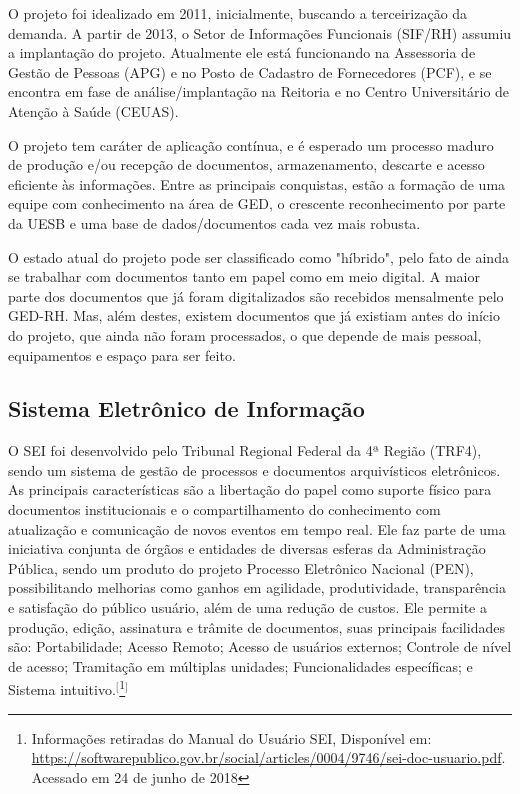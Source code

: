 O projeto foi idealizado em 2011, inicialmente, buscando a terceirização da demanda. A partir de 2013, o Setor de Informações Funcionais (SIF/RH) assumiu a implantação do projeto. Atualmente ele está funcionando na Assessoria de Gestão de Pessoas (APG) e no Posto de Cadastro de Fornecedores (PCF), e se encontra em fase de análise/implantação na Reitoria e no Centro Universitário de Atenção à Saúde (CEUAS). 

O projeto tem caráter de aplicação contínua, e é esperado um processo maduro de produção e/ou recepção de documentos, armazenamento, descarte e acesso eficiente às informações. Entre as principais conquistas, estão a formação de uma equipe com conhecimento na área de GED, o crescente reconhecimento por parte da UESB e uma base de dados/documentos cada vez mais robusta. 

O estado atual do projeto pode ser classificado como "híbrido", pelo fato de ainda se trabalhar com documentos tanto em papel como em meio digital. A maior parte dos documentos que já foram digitalizados são recebidos mensalmente pelo GED-RH. Mas, além destes, existem documentos que já existiam antes do início do projeto, que ainda não foram processados, o que depende de mais pessoal, equipamentos e espaço para ser feito.

\subsection{Sistema Eletrônico de Informação}

O SEI foi desenvolvido pelo Tribunal Regional Federal da 4ª Região (TRF4), sendo um sistema de gestão de processos e documentos arquivísticos eletrônicos. As principais características são a libertação do papel como suporte físico para documentos institucionais e o compartilhamento do conhecimento com atualização e comunicação de novos eventos em tempo real. Ele faz parte de uma iniciativa conjunta de órgãos e entidades de diversas esferas da Administração Pública, sendo um produto do projeto Processo Eletrônico Nacional (PEN), possibilitando melhorias como ganhos em agilidade, produtividade, transparência e satisfação do público usuário, além de uma redução de custos. Ele permite a produção, edição, assinatura e trâmite de documentos, suas principais facilidades são: Portabilidade; Acesso Remoto; Acesso de usuários externos; Controle de nível de acesso; Tramitação em múltiplas unidades; Funcionalidades específicas; e Sistema intuitivo.$^{[}$\footnote{Informações retiradas do Manual do Usuário SEI, Disponível em: \url{https://softwarepublico.gov.br/social/articles/0004/9746/sei-doc-usuario.pdf}.  Acessado em 24 de junho de 2018}$^{]}$

